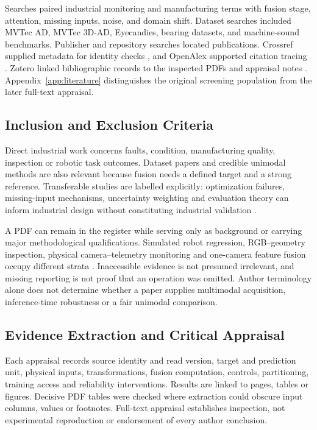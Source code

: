 Searches paired industrial monitoring and manufacturing terms with fusion stage, attention, missing inputs, noise, and domain shift. Dataset searches included MVTec AD, MVTec 3D-AD, Eyecandies, bearing datasets, and machine-sound benchmarks. Publisher and repository searches located publications. Crossref supplied metadata for identity checks \citep{Crossref2020REST}, and OpenAlex supported citation tracing \citep{Priem2022OpenAlex}. Zotero linked bibliographic records to the inspected PDFs and appraisal notes \citep{Zotero2026}. Appendix~\ref{app:literature} distinguishes the original screening population from the later full-text appraisal.

\subsection{Inclusion and Exclusion Criteria}
Direct industrial work concerns faults, condition, manufacturing quality, inspection or robotic task outcomes. Dataset papers and credible unimodal methods are also relevant because fusion needs a defined target and a strong reference. Transferable studies are labelled explicitly: optimization failures, missing-input mechanisms, uncertainty weighting and evaluation theory can inform industrial design without constituting industrial validation \citep{Wang2020What,P016,P023,Bengio2004CVVariance}.

A PDF can remain in the register while serving only as background or carrying major methodological qualifications. Simulated robot regression, RGB--geometry inspection, physical camera--telemetry monitoring and one-camera feature fusion occupy different strata \citep{Altinses2023Fuzzy,P026,Thoduka2024Handover,P035}. Inaccessible evidence is not presumed irrelevant, and missing reporting is not proof that an operation was omitted. Author terminology alone does not determine whether a paper supplies multimodal acquisition, inference-time robustness or a fair unimodal comparison.

\subsection{Evidence Extraction and Critical Appraisal}
Each appraisal records source identity and read version, target and prediction unit, physical inputs, transformations, fusion computation, controls, partitioning, training access and reliability interventions. Results are linked to pages, tables or figures. Decisive PDF tables were checked where extraction could obscure input columns, values or footnotes. Full-text appraisal establishes inspection, not experimental reproduction or endorsement of every author conclusion.

